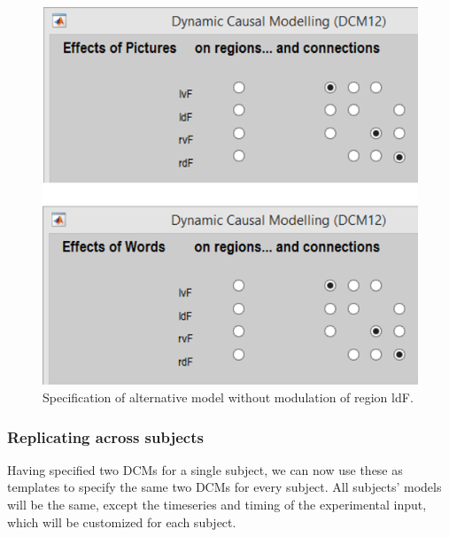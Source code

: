 \documentclass{article}
\begin{document}
\begin{figure}[ht]
\begin{center}
\includegraphics{"Fig_dcm_spec_no_ldF"}
\caption{Specification of alternative model without modulation of region ldF.\label{Fig_dcm_spec_no_ldF}}
\end{center}
\end{figure}

\subsubsection{Replicating across subjects} \label{GUI_replicating}

Having specified two DCMs for a single subject, we can now use these as templates to specify the same two DCMs for every subject. All subjects' models will be the same, except the timeseries and timing of the experimental input, which will be customized for each subject.
\end{document}
